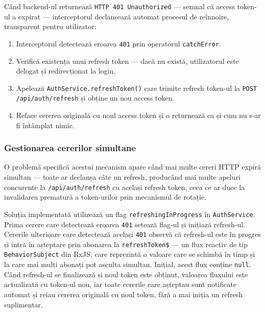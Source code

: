 \documentclass[12pt, a4paper]{report}
\begin{document}
Când backend-ul returnează \texttt{HTTP 401 Unauthorized} --- semnal că access
token-ul a expirat --- interceptorul declanșează automat procesul de reînnoire,
transparent pentru utilizator:

\begin{enumerate}
    \item Interceptorul detectează eroarea \texttt{401} prin operatorul
          \texttt{catchError}.
    \item Verifică existența unui refresh token --- dacă nu există, utilizatorul
          este delogat și redirecționat la login.
    \item Apelează \texttt{AuthService.refreshToken()} care trimite refresh
          token-ul la \texttt{POST /api/auth/refresh} și obține un nou access token.
    \item Reface cererea originală cu noul access token și o returnează ca și cum
          nu s-ar fi întâmplat nimic.
\end{enumerate}

\subsubsection{Gestionarea cererilor simultane}

O problemă specifică acestui mecanism apare când mai multe cereri HTTP expiră
simultan --- toate ar declanșa câte un refresh, producând mai multe apeluri
concurente la \texttt{/api/auth/refresh} cu același refresh token, ceea ce ar
duce la invalidarea prematură a token-urilor prin mecanismul de rotație.

Soluția implementată utilizează un flag \texttt{refreshingInProgress} în
\texttt{AuthService}. Prima cerere care detectează eroarea \texttt{401} setează
flag-ul și inițiază refresh-ul. Cererile ulterioare care detectează același
\texttt{401} observă că refresh-ul este în progres și intră în așteptare prin
abonarea la \texttt{refreshToken\$} --- un flux reactiv de tip
\texttt{BehaviorSubject} din RxJS, care reprezintă o valoare care se schimbă în
timp și la care mai mulți abonați pot asculta simultan. Inițial, acest flux conține
\texttt{null}. Când refresh-ul se finalizează și noul token este obținut, valoarea
fluxului este actualizată cu token-ul nou, iar toate cererile care așteptau sunt
notificate automat și reiau cererea originală cu noul token, fără a mai iniția un
refresh suplimentar.


\end{document}
